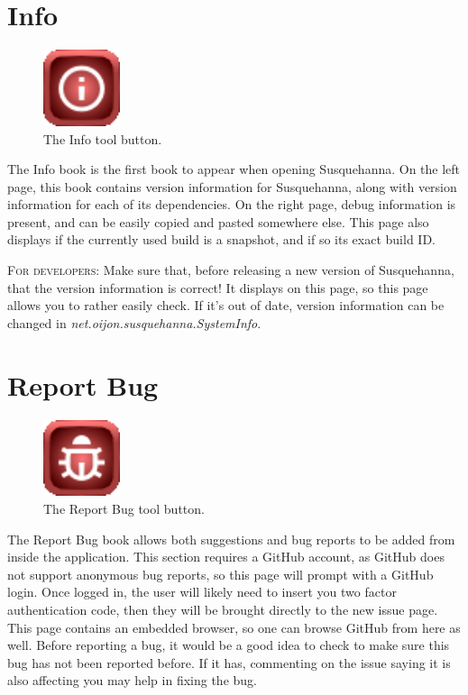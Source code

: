 \documentclass{report}
\begin{document}
	\section{Info}
	\begin{figure}
		\centering
		\includegraphics[width=0.2\textwidth]{img/info}
		\caption{The Info tool button.}
		\label{fig:info}
	\end{figure}
	The Info book is the first book to appear when opening Susquehanna. On the left page, this book contains version information for Susquehanna, along with version information for each of its dependencies. On the right page, debug information is present, and can be easily copied and pasted somewhere else. This page also displays if the currently used build is a snapshot, and if so its exact build ID.
	\begin{tcolorbox}[width=1\textwidth]
		\textsc{For developers:} Make sure that, before releasing a new version of Susquehanna, that the version information is correct! It displays on this page, so this page allows you to rather easily check. If it's out of date, version information can be changed in \emph{net.oijon.susquehanna.SystemInfo}.
	\end{tcolorbox}
	\section{Report Bug}
	\begin{figure}
		\centering
		\includegraphics[width=0.2\textwidth]{img/report-bug}
		\caption{The Report Bug tool button.}
		\label{fig:report-bug}
	\end{figure}
	The Report Bug book allows both suggestions and bug reports to be added from inside the application. This section requires a GitHub account, as GitHub does not support anonymous bug reports, so this page will prompt with a GitHub login. Once logged in, the user will likely need to insert you two factor authentication code, then they will be brought directly to the new issue page. This page contains an embedded browser, so one can browse GitHub from here as well. Before reporting a bug, it would be a good idea to check to make sure this bug has not been reported before. If it has, commenting on the issue saying it is also affecting you may help in fixing the bug.
	
\end{document}
